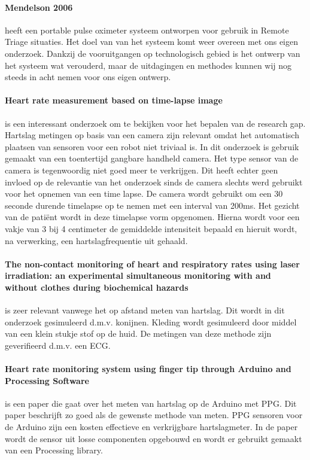 \documentclass[11pt]{article}
\begin{document}
    \paragraph{Mendelson 2006} heeft een portable pulse oximeter systeem ontworpen voor gebruik in Remote Triage situaties. 
    Het doel van van het systeem komt weer overeen met ons eigen onderzoek. 
    Dankzij de vooruitgangen op technologisch gebied is het ontwerp van het systeem wat verouderd, maar de uitdagingen en methodes kunnen wij nog steeds in acht nemen voor ons eigen ontwerp.

    \paragraph{Heart rate measurement based on time-lapse image} is een interessant onderzoek om te bekijken voor het bepalen van de research gap. 
    Hartslag metingen op basis van een camera zijn relevant omdat het automatisch plaatsen van sensoren voor een robot niet triviaal is. 
    In dit onderzoek is gebruik gemaakt van een toentertijd gangbare handheld camera. 
    Het type sensor van de camera is tegenwoordig niet goed meer te verkrijgen. 
    Dit heeft echter geen invloed op de relevantie van het onderzoek sinds de camera slechts werd gebruikt voor het opnemen van een time lapse. 
    De camera wordt gebruikt om een 30 seconde durende timelapse op te nemen met een interval van 200ms. 
    Het gezicht van de patiënt wordt in deze timelapse vorm opgenomen. 
    Hierna wordt voor een vakje van 3 bij 4 centimeter de gemiddelde intensiteit bepaald en hieruit wordt, na verwerking, een hartslagfrequentie uit gehaald.

    \paragraph{The non-contact monitoring of heart and respiratory rates using laser irradiation: an experimental simultaneous monitoring with and without clothes during biochemical hazards} is zeer relevant vanwege het op afstand meten van hartslag. 
    Dit wordt in dit onderzoek gesimuleerd d.m.v. konijnen. Kleding wordt gesimuleerd door middel van een klein stukje stof op de huid. 
    De metingen van deze methode zijn geverifieerd d.m.v. een ECG.

    \paragraph{Heart rate monitoring system using finger tip through Arduino and Processing Software} is een paper die gaat over het meten van hartslag op de Arduino met PPG. 
    Dit paper beschrijft zo goed als de gewenste methode van meten. 
    PPG sensoren voor de Arduino zijn een kosten effectieve en verkrijgbare hartslagmeter. 
    In de paper wordt de sensor uit losse componenten opgebouwd en wordt er gebruikt gemaakt van een Processing library.
\end{document}
